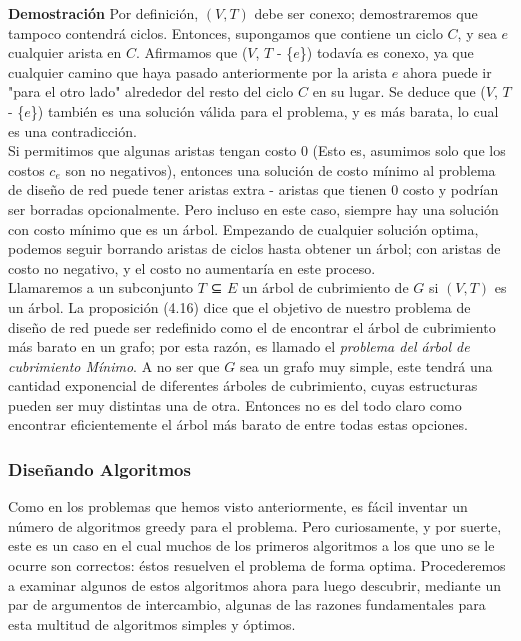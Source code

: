 \documentclass[a4paper, 12pt]{book}
\begin{document}
\textbf{Demostración} Por definición, $(V,T)$ debe ser conexo; demostraremos que tampoco contendrá ciclos. Entonces, supongamos que contiene un ciclo $C$, y sea $e$ cualquier
arista en $C$. Afirmamos que ($V$, $T$ - \{$e$\}) todavía es conexo, ya que cualquier camino que haya pasado anteriormente por la arista $e$ ahora puede ir "para el otro lado" alrededor del resto
del ciclo $C$ en su lugar. Se deduce que ($V$, $T$ - \{$e$\}) también es una solución válida para el
problema, y es más barata, lo cual es una contradicción.\\

Si permitimos que algunas aristas tengan costo 0 (Esto es, asumimos solo que los costos $c_e$ son no negativos), entonces una solución de costo mínimo al problema de diseño de red puede tener aristas extra -  aristas que tienen 0 costo y podrían ser borradas opcionalmente. Pero incluso en este caso, siempre hay una solución con costo mínimo que es un árbol. Empezando de cualquier solución optima, podemos seguir borrando aristas de ciclos hasta obtener un árbol; con aristas de costo no negativo, y el costo no aumentaría en este proceso.\\
	
Llamaremos a un subconjunto $T$ ⊆ $E$ un árbol de cubrimiento de $G$ si $(V,T)$ es un árbol. La proposición (4.16) dice que el objetivo de nuestro problema de diseño de red puede ser redefinido como el de encontrar el árbol de cubrimiento más barato en un grafo; por esta razón, es llamado el \textit{problema del árbol de cubrimiento Mínimo}. A no ser que $G$ sea un grafo muy simple, este tendrá una cantidad exponencial de diferentes árboles de cubrimiento, cuyas estructuras pueden ser muy distintas una de otra. Entonces no es del todo claro como encontrar eficientemente el árbol más barato de entre todas estas opciones.\\
    
\subsubsection*{Diseñando Algoritmos}
Como en los problemas que hemos visto anteriormente, es fácil inventar un número de algoritmos greedy para el problema. Pero curiosamente, y por suerte, este es un caso en el cual muchos de los primeros algoritmos a los que uno se le ocurre son correctos: éstos resuelven el problema de forma optima. Procederemos a examinar algunos de estos algoritmos ahora para luego descubrir, mediante un par de argumentos de intercambio, algunas de las razones fundamentales para esta multitud de algoritmos simples y óptimos.\\
\end{document}
